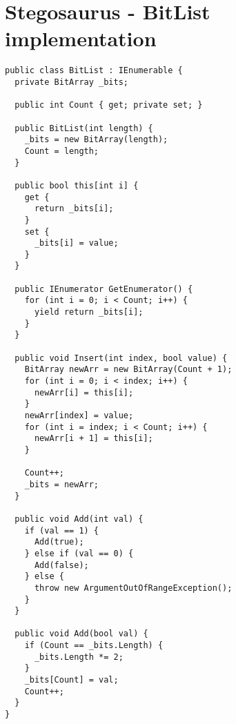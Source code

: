 \chapter{Stegosaurus - BitList implementation}
\label{app:C}
\begin{lstlisting}
public class BitList : IEnumerable {
  private BitArray _bits;

  public int Count { get; private set; }

  public BitList(int length) {
    _bits = new BitArray(length);
    Count = length;
  }

  public bool this[int i] {
    get {
      return _bits[i];
    }
    set {
      _bits[i] = value;
    }
  }

  public IEnumerator GetEnumerator() {
    for (int i = 0; i < Count; i++) {
      yield return _bits[i];
    }
  }

  public void Insert(int index, bool value) {
    BitArray newArr = new BitArray(Count + 1);
    for (int i = 0; i < index; i++) {
      newArr[i] = this[i];
    }
    newArr[index] = value;
    for (int i = index; i < Count; i++) {
      newArr[i + 1] = this[i];
    }

    Count++;
    _bits = newArr;
  }

  public void Add(int val) {
    if (val == 1) {
      Add(true);
    } else if (val == 0) {
      Add(false);
    } else {
      throw new ArgumentOutOfRangeException();
    }
  }

  public void Add(bool val) {
    if (Count == _bits.Length) {
      _bits.Length *= 2;
    }
    _bits[Count] = val;
    Count++;
  }
}
\end{lstlisting}